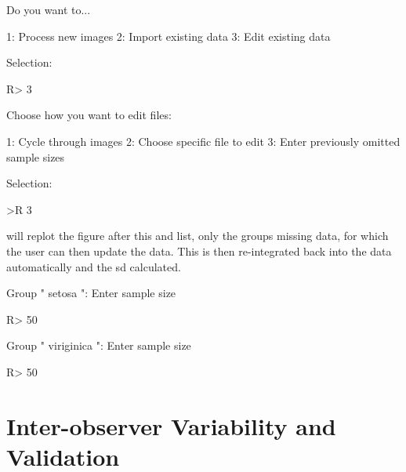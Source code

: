 \documentclass[article]{jss}
\newcommand{\fct}[1]{\code{#1()}}
\begin{document}
\begin{CodeChunk}
\begin{CodeOutput}
Do you want to...

1: Process new images
2: Import existing data
3: Edit existing data

Selection:
\end{CodeOutput}
\begin{CodeInput}
R> 3
\end{CodeInput}
\end{CodeChunk}

\begin{CodeChunk}
\begin{CodeOutput}
Choose how you want to edit files:

1: Cycle through images
2: Choose specific file to edit
3: Enter previously omitted sample sizes

Selection:
\end{CodeOutput}
\begin{CodeInput}
>R 3
\end{CodeInput}
\end{CodeChunk}

\fct{metaDigitise} will replot the figure after this and list, only the groups missing data, for which the user can then update the data. This is then re-integrated back into the data automatically and the sd calculated. 

\begin{CodeChunk}
\begin{CodeOutput}
Group " setosa ": Enter sample size  
\end{CodeOutput}
\begin{CodeInput}
R> 50
\end{CodeInput}
\begin{CodeOutput}
Group " viriginica ": Enter sample size
\end{CodeOutput}
\begin{CodeInput}
R> 50
\end{CodeInput}
\end{CodeChunk}

\section{Inter-observer Variability and Validation}
\end{document}
